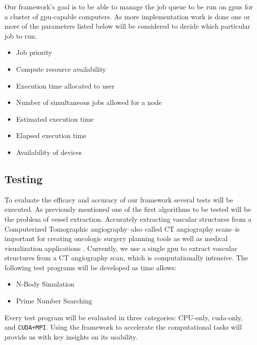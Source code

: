 Our framework's goal is to be able to manage the job queue to be run on
\glspl{gpu} for a cluster of \gls{gpu}-capable computers. As more
implementation work is done one or more of the parameters listed below will be
considered to decide which particular job to run.

\begin{itemize}
    \item Job priority
    \item Compute resource availability
    \item Execution time allocated to user
    \item Number of simultaneous jobs allowed for a node
    \item Estimated execution time
    \item Elapsed execution time
    \item Availability of devices
\end{itemize}


\subsection{Testing}

To evaluate the efficacy and accuracy of our framework several tests will be
executed. As previously mentioned one of the first algorithms to be tested will
be the problem of vessel extraction. Accurately extracting vascular structures
from a Computerized Tomographic angiography--also called CT angiography
scans--is important for creating oncologic surgery planning tools as well as
medical visualization applications \cite{erdt2008automatic}.  Currently, we use
a single \gls{gpu} to extract vascular structures from a CT angiography scan,
which is computationally intensive. The following test programs will be
developed as time allows:

\begin{itemize}
    \item N-Body Simulation
    \item Prime Number Searching
\end{itemize}

Every test program will be evaluated in three categories: CPU-only,
\gls{cuda}-only, and \texttt{CUDA+MPI}. Using the framework to accelerate the
computational tasks will provide us with key insights on its usability.
